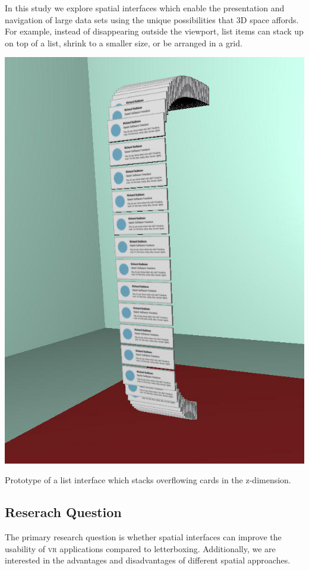 \documentclass{tufte-book} %
\begin{document}
In this study we explore spatial interfaces which enable the presentation and navigation of large data sets using the unique possibilities that 3D space affords. For example, instead of disappearing outside the viewport, list items can stack up on top of a list, shrink to a smaller size, or be arranged in a grid.

\begin{marginfigure}
  \includegraphics[width=\linewidth]{email.png}
  \caption{Prototype of a list interface which stacks overflowing cards in the z-dimension.}
  \label{fig:email}
\end{marginfigure}

\subsection{Reserach Question}
The primary research question is whether spatial interfaces can improve the usability of \textsc{vr} applications compared to letterboxing. Additionally, we are interested in the advantages and disadvantages of different spatial approaches.
\end{document}
